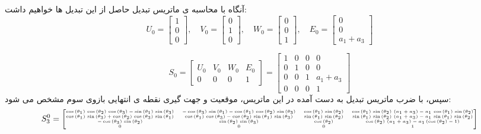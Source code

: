  آنگاه با محاسبه ی ماتریس تبدیل حاصل از این تبدیل ها خواهیم داشت:
 \[
 U_0 = \begin{bmatrix} 1 \\ 0 \\ 0 \end{bmatrix}, \quad
 V_0 = \begin{bmatrix} 0 \\ 1 \\ 0 \end{bmatrix}, \quad
 W_0 = \begin{bmatrix} 0 \\ 0 \\ 1 \end{bmatrix}, \quad
 E_0 = \begin{bmatrix} 0 \\ 0 \\ a_1 + a_3 \end{bmatrix}
 \]
 
 \[
 S_0 = \begin{bmatrix}
 	U_0 & V_0 & W_0 & E_0 \\
 	0 & 0 & 0 & 1
 \end{bmatrix} = 
 \begin{bmatrix}
 	1 & 0 & 0 & 0 \\
 	0 & 1 & 0 & 0 \\
 	0 & 0 & 1 & a_1 + a_3 \\
 	0 & 0 & 0 & 1
 \end{bmatrix}
 \]
 سپس، با ضرب ماتریس تبدیل به دست آمده در این ماتریس، موقعیت و جهت گیری نقطه ی انتهایی بازوی سوم مشخص می شود:
 \[
 \tiny
 S_3^0 = 
 \begin{bmatrix}
 	\cos \left(\theta_1 \right)\,\cos \left(\theta_2 \right)\,\cos \left(\theta_3 \right) - \sin \left(\theta_1 \right)\,\sin \left(\theta_3 \right) & -\cos \left(\theta_3 \right)\,\sin \left(\theta_1 \right) - \cos \left(\theta_1 \right)\,\cos \left(\theta_2 \right)\,\sin \left(\theta_3 \right) & \cos \left(\theta_1 \right)\,\sin \left(\theta_2 \right) & \cos \left(\theta_1 \right)\,\sin \left(\theta_2 \right)\,(a_1 + a_3) - a_1 \,\cos \left(\theta_1 \right)\,\sin \left(\theta_2 \right) \\
 	\cos \left(\theta_1 \right)\,\sin \left(\theta_3 \right) + \cos \left(\theta_2 \right)\,\cos \left(\theta_3 \right)\,\sin \left(\theta_1 \right) & \cos \left(\theta_1 \right)\,\cos \left(\theta_3 \right) - \cos \left(\theta_2 \right)\,\sin \left(\theta_1 \right)\,\sin \left(\theta_3 \right) & \sin \left(\theta_1 \right)\,\sin \left(\theta_2 \right) & \sin \left(\theta_1 \right)\,\sin \left(\theta_2 \right)\,(a_1 + a_3) - a_1 \,\sin \left(\theta_1 \right)\,\sin \left(\theta_2 \right) \\
 	-\cos \left(\theta_3 \right)\,\sin \left(\theta_2 \right) & \sin \left(\theta_2 \right)\,\sin \left(\theta_3 \right) & \cos \left(\theta_2 \right) & \cos \left(\theta_2 \right)\,(a_1 + a_3) - a_1 \,(\cos \left(\theta_2 \right) - 1) \\
 	0 & 0 & 0 & 1
 \end{bmatrix}
 \]
 
